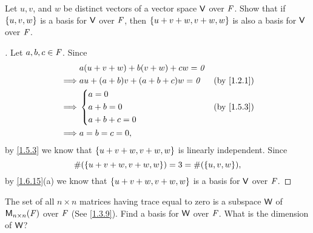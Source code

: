 \begin{ex}\label{ex:1.6.12}
	Let \(u, v\), and \(w\) be distinct vectors of a vector space \(\mathsf{V}\) over \(\mathit{F}\).
	Show that if \(\left\lbrace u, v, w\right\rbrace\) is a basis for \(\mathsf{V}\) over \(\mathit{F}\), then \(\left\lbrace u + v + w, v + w, w\right\rbrace\) is also a basis for \(\mathsf{V}\) over \(\mathit{F}\).
\end{ex}

\begin{proof}[]
	Let \(a, b, c \in \mathit{F}\).
	Since
	\begin{align*}
		         & a(u + v + w) + b(v + w) + cw = \zv                 \\
		\implies & au + (a + b)v + (a + b + c)w = \zv &  & \by{1.2.1} \\
		\implies & \begin{dcases}
			           a = 0     \\
			           a + b = 0 \\
			           a + b + c = 0
		           \end{dcases}                     &  & \by{1.5.3}   \\
		\implies & a = b = c = 0,
	\end{align*}
	by \cref{1.5.3} we know that \(\left\lbrace u + v + w, v + w, w\right\rbrace\) is linearly independent.
	Since
	\[
		\#(\left\lbrace u + v + w, v + w, w\right\rbrace) = 3 = \#(\left\lbrace u, v, w\right\rbrace),
	\]
	by \cref{1.6.15}(a) we know that \(\left\lbrace u + v + w, v + w, w\right\rbrace\) is a basis for \(\mathsf{V}\) over \(\mathit{F}\).
\end{proof}

\setcounter{ex}{14}
\begin{ex}\label{ex:1.6.15}
	The set of all \(n \times n\) matrices having trace equal to zero is a subspace \(\mathsf{W}\) of \(\ms[n][n][\F]\) over \(\mathit{F}\) (See \cref{1.3.9}).
	Find a basis for \(\mathsf{W}\) over \(\mathit{F}\).
	What is the dimension of \(\mathsf{W}\)?
\end{ex}

